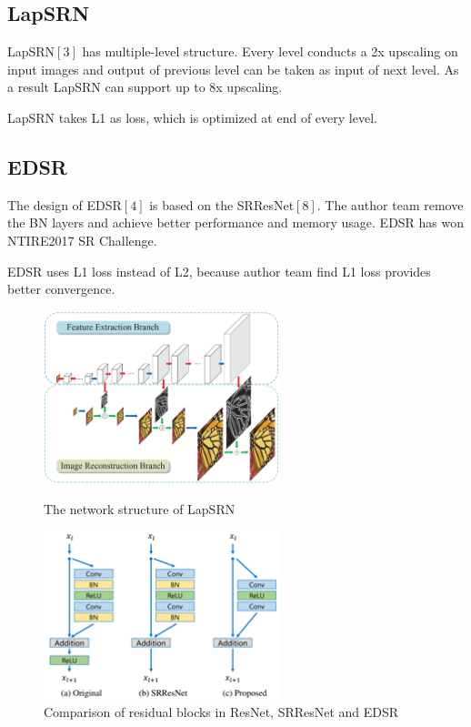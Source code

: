 \documentclass{article}
\begin{document}
  \subsection{LapSRN}
  LapSRN$[3]$ has multiple-level structure. Every level conducts a 2x upscaling on input 
  images and output of previous level can be taken as input of next level. As a result LapSRN can support up to 8x upscaling. 
  
  LapSRN takes L1 as loss, which is optimized at end of every level.
  
  \subsection{EDSR}
  The design of EDSR$[4]$ is based on the SRResNet$[8]$. 
  The author team remove the BN layers and achieve better performance and memory usage. 
  EDSR has won NTIRE2017 SR Challenge.

  EDSR uses L1 loss instead of L2, because author team find L1 loss provides better convergence.
  
  \begin{figure}[H]
    \begin{minipage}[H]{0.5\linewidth}
    \centering
    \includegraphics[width=2.7in]{images/LapSRN.png}
    \caption{The network structure of LapSRN}

    \end{minipage}
    \begin{minipage}[H]{0.5\linewidth}
    \centering
    \includegraphics[width=2.7in]{images/EDSR1.png}
    \caption{Comparison of residual blocks in ResNet, SRResNet and EDSR}

    \end{minipage}
\end{figure}
\end{document}
